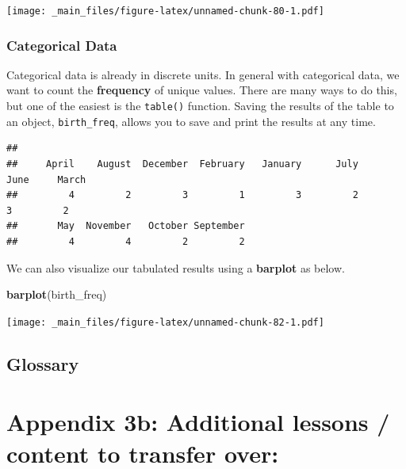 \documentclass[
]{book}
\newenvironment{Shaded}{\begin{snugshade}}{\end{snugshade}}
\newcommand{\FunctionTok}[1]{\textcolor[rgb]{0.13,0.29,0.53}{\textbf{#1}}}
\newcommand{\NormalTok}[1]{#1}
\newcommand{\OtherTok}[1]{\textcolor[rgb]{0.56,0.35,0.01}{#1}}
\newcommand{\SpecialCharTok}[1]{\textcolor[rgb]{0.81,0.36,0.00}{\textbf{#1}}}
\begin{document}
\texttt{[image: \_main\_files/figure-latex/unnamed-chunk-80-1.pdf]}

\hypertarget{categorical-data}{%
\subsection{Categorical Data}\label{categorical-data}}

Categorical data is already in discrete units. In general with categorical data, we want to count the \textbf{frequency} of unique values. There are many ways to do this, but one of the easiest is the \texttt{table()} function. Saving the results of the table to an object, \texttt{birth\_freq}, allows you to save and print the results at any time.

\begin{Shaded}
\end{Shaded}

\begin{verbatim}
## 
##     April    August  December  February   January      July      June     March 
##         4         2         3         1         3         2         3         2 
##       May  November   October September 
##         4         4         2         2
\end{verbatim}

We can also visualize our tabulated results using a \textbf{barplot} as below.

\begin{Shaded}
\begin{Highlighting}[]
\FunctionTok{barplot}\NormalTok{(birth\_freq)}
\end{Highlighting}
\end{Shaded}

\texttt{[image: \_main\_files/figure-latex/unnamed-chunk-82-1.pdf]}

\hypertarget{glossary-2}{%
\section*{Glossary}\label{glossary-2}}

\hypertarget{appendix-3b-additional-lessons-content-to-transfer-over-1}{%
\chapter*{Appendix 3b: Additional lessons / content to transfer over:}\label{appendix-3b-additional-lessons-content-to-transfer-over-1}}
\end{document}
